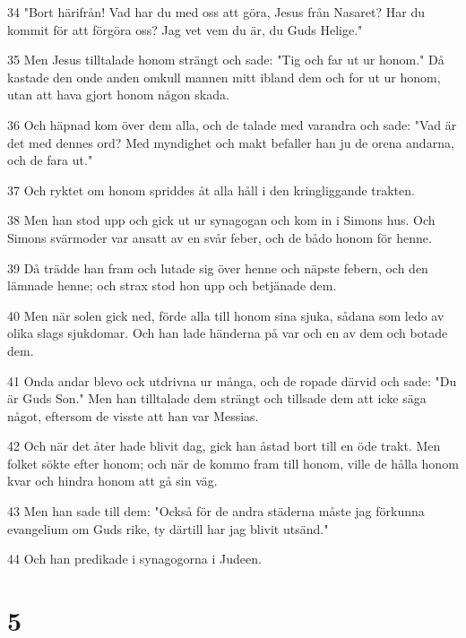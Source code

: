 \par 34 "Bort härifrån! Vad har du med oss att göra, Jesus från Nasaret? Har du kommit för att förgöra oss? Jag vet vem du är, du Guds Helige."
\par 35 Men Jesus tilltalade honom strängt och sade: "Tig och far ut ur honom." Då kastade den onde anden omkull mannen mitt ibland dem och for ut ur honom, utan att hava gjort honom någon skada.
\par 36 Och häpnad kom över dem alla, och de talade med varandra och sade: "Vad är det med dennes ord? Med myndighet och makt befaller han ju de orena andarna, och de fara ut."
\par 37 Och ryktet om honom spriddes åt alla håll i den kringliggande trakten.
\par 38 Men han stod upp och gick ut ur synagogan och kom in i Simons hus. Och Simons svärmoder var ansatt av en svår feber, och de bådo honom för henne.
\par 39 Då trädde han fram och lutade sig över henne och näpste febern, och den lämnade henne; och strax stod hon upp och betjänade dem.
\par 40 Men när solen gick ned, förde alla till honom sina sjuka, sådana som ledo av olika slags sjukdomar. Och han lade händerna på var och en av dem och botade dem.
\par 41 Onda andar blevo ock utdrivna ur många, och de ropade därvid och sade: "Du är Guds Son." Men han tilltalade dem strängt och tillsade dem att icke säga något, eftersom de visste att han var Messias.
\par 42 Och när det åter hade blivit dag, gick han åstad bort till en öde trakt. Men folket sökte efter honom; och när de kommo fram till honom, ville de hålla honom kvar och hindra honom att gå sin väg.
\par 43 Men han sade till dem: "Också för de andra städerna måste jag förkunna evangelium om Guds rike, ty därtill har jag blivit utsänd."
\par 44 Och han predikade i synagogorna i Judeen.

\chapter{5}

